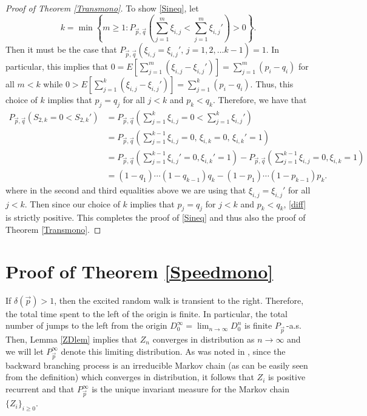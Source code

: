 \documentclass[reqno,letterpaper,11pt]{amsart}
\theoremstyle{remark}
\theoremstyle{definition}
\begin{document}
\begin{proof}[Proof of Theorem \ref{Transmono}]
To show \eqref{Sineq}, let 
\[
 k = \min \left\{ m\geq 1: P_{{\vec{p}},{\vec{q}}}\left( \sum_{j=1}^m \xi_{i,j} < \sum_{j=1}^m \xi_{i,j}'  \right) > 0 \right\}.
\]
Then it must be the case that $P_{{\vec{p}},{\vec{q}}}( \xi_{i,j} = \xi_{i,j}', \, j=1,2,\ldots k-1 ) = 1$. In particular, this implies that $0 = E[\sum_{j=1}^m (\xi_{i,j} - \xi_{i,j}') ] = \sum_{j=1}^m (p_i - q_i)$ for all $m < k$ while 
$0 > E[\sum_{j=1}^k (\xi_{i,j} - \xi_{i,j}') ] = \sum_{j=1}^k (p_i - q_i)$. Thus, this choice of $k$ implies that $p_j = q_j$ for all $j<k$ and $p_k < q_k$. 
Therefore, we have that 
\begin{align}
 P_{{\vec{p}},{\vec{q}}}(S_{2,k} = 0 < S_{2,k}') &= P_{{\vec{p}},{\vec{q}}}\left( \sum_{j=1}^{k} \xi_{i,j} = 0 < \sum_{j=1}^{k} \xi_{i,j}' \right)   \nonumber     \\
&= P_{{\vec{p}},{\vec{q}}}\left( \sum_{j=1}^{k-1} \xi_{i,j} = 0, \, \xi_{i,k} = 0, \, \xi_{i,k}'=1 \right) \nonumber \\
&= P_{{\vec{p}},{\vec{q}}}\left( \sum_{j=1}^{k-1} \xi_{i,j}' = 0, \xi_{i,k}'=1 \right) - P_{{\vec{p}},{\vec{q}}}\left( \sum_{j=1}^{k-1} \xi_{i,j} = 0, \xi_{i,k}=1 \right) \nonumber \\
&= (1-q_1)\cdots(1-q_{k-1})q_k - (1-p_1)\cdots(1-p_{k-1})p_k. \label{diff}
\end{align}
where in the second and third equalities above we are using that $\xi_{i,j} = \xi_{i,j}'$ for all $j < k$. Then since our choice of $k$ implies that $p_j = q_j$ for $j<k$ and $p_k < q_k$, \eqref{diff} is strictly positive. 
This completes the proof of \eqref{Sineq} and thus also the proof of Theorem \ref{Transmono}. 
\end{proof}

\section{Proof of Theorem \ref{Speedmono}} \label{sec:SM}

If ${\delta}({\vec{p}}) > 1$, then the excited random walk is transient to the right. Therefore, the total time spent to the left of the origin is finite. In particular, the total number of jumps to the left from the origin $D_0^\infty = \lim_{n{\rightarrow}\infty} D_0^n $ is finite $P_{\vec{p}}$\,-a.s. Then, Lemma \ref{ZDlem} implies that $Z_n$ converges in distribution as $n{\rightarrow}\infty$ and we will let $P_{\vec{p}}^\infty$ denote this limiting distribution. 
As was noted in \cite{bsCRWspeed}, since the backward branching process is an irreducible Markov chain (as can be easily seen from the definition) which converges in distribution, it follows that $Z_i$ is positive recurrent and that $P_{\vec{p}}^\infty$ is the unique invariant measure for the Markov chain $\{Z_i\}_{i\geq 0}$.  
\end{document}
